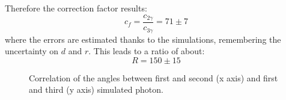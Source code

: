 \documentclass[main.tex]{subfiles}
\begin{document}
Therefore the correction factor results:
\begin{equation}
  c_f = \frac{c_{2\gamma}}{c_{3\gamma}} = 71\pm7
\end{equation}
where the errors are estimated thanks to the simulations, remembering the uncertainty on $d$ and $r$.
This leads to a ratio of about:
\begin{equation}
  R = 150 \pm 15
\end{equation}

\begin{figure}[H]
  \centering
  \caption{Correlation of the angles between first and second (x axis) and first and third (y axis) simulated photon.}
  \label{fig:sim:ang:corr}
\end{figure}


\end{document}
